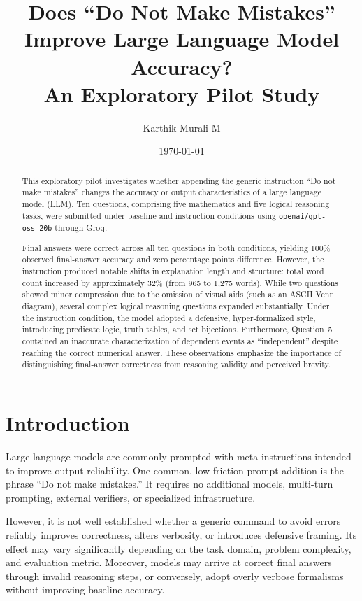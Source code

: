 \documentclass[11pt,a4paper]{article}
\title{Does ``Do Not Make Mistakes'' Improve Large Language Model Accuracy?\\
\large An Exploratory Pilot Study}
\author{Karthik Murali M}
\date{\today}
\begin{document}
\maketitle

\begin{abstract}
This exploratory pilot investigates whether appending the generic
instruction ``Do not make mistakes'' changes the accuracy or output
characteristics of a large language model (LLM). Ten questions,
comprising five mathematics and five logical reasoning tasks, were
submitted under baseline and instruction conditions using
\texttt{openai/gpt-oss-20b} through Groq.

Final answers were correct across all ten questions in both conditions,
yielding 100\% observed final-answer accuracy and zero percentage points
difference. However, the instruction produced notable shifts in explanation
length and structure: total word count increased by approximately 32\%
(from 965 to 1,275 words). While two questions showed minor compression
due to the omission of visual aids (such as an ASCII Venn diagram), several
complex logical reasoning questions expanded substantially. Under the
instruction condition, the model adopted a defensive, hyper-formalized
style, introducing predicate logic, truth tables, and set bijections.
Furthermore, Question~5 contained an inaccurate characterization of
dependent events as ``independent'' despite reaching the correct numerical
answer. These observations emphasize the importance of distinguishing
final-answer correctness from reasoning validity and perceived brevity.
\end{abstract}

\section{Introduction}

Large language models are commonly prompted with meta-instructions intended
to improve output reliability. One common, low-friction prompt addition is
the phrase ``Do not make mistakes.'' It requires no additional models,
multi-turn prompting, external verifiers, or specialized infrastructure.

However, it is not well established whether a generic command to avoid errors
reliably improves correctness, alters verbosity, or introduces defensive
framing. Its effect may vary significantly depending on the task domain,
problem complexity, and evaluation metric. Moreover, models may arrive at
correct final answers through invalid reasoning steps, or conversely, adopt
overly verbose formalisms without improving baseline accuracy.
\end{document}
